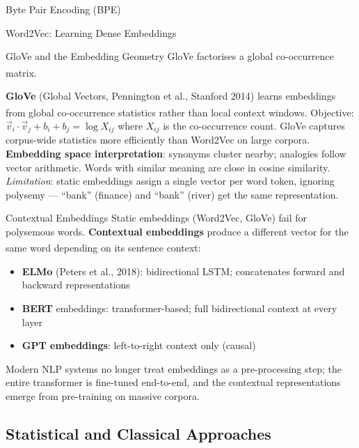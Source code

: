 \begin{v3topic}{Byte Pair Encoding (BPE)}
\begin{v3topic}{Word2Vec: Learning Dense Embeddings}
\end{v3topic}
\begin{v3topic}{GloVe and the Embedding Geometry}
    GloVe factorises a global co-occurrence
    matrix\textsuperscript{\cite{penningtonGloVeGlobalVectors2014}}.

    \textbf{GloVe} (Global Vectors, Pennington et al., Stanford 2014) learns embeddings from global co-occurrence statistics rather than local context windows\textsuperscript{\cite[][p.~35]{farrisHowLargeLanguage2025}}.
    Objective: $\vec{v}_i \cdot \vec{v}_j + b_i + b_j = \log X_{ij}$ where $X_{ij}$ is the co-occurrence count.
    GloVe captures corpus-wide statistics more efficiently than Word2Vec on large corpora.
\visualseparator
    \textbf{Embedding space interpretation}: synonyms cluster nearby; analogies follow vector arithmetic.
    Words with similar meaning are close in cosine similarity.
    \emph{Limitation}: static embeddings assign a single vector per word token, ignoring polysemy --- ``bank'' (finance) and ``bank'' (river) get the same representation.

\end{v3topic}
\begin{v3topic}{Contextual Embeddings}
    Static embeddings (Word2Vec, GloVe) fail for polysemous words.
    \textbf{Contextual embeddings} produce a different vector for the same word depending on its sentence context\textsuperscript{\cite[][p.~35]{farrisHowLargeLanguage2025}}:
    \begin{itemize}
        \item \textbf{ELMo} (Peters et al., 2018): bidirectional LSTM; concatenates forward and backward representations
        \item \textbf{BERT} embeddings: transformer-based; full bidirectional context at every layer
        \item \textbf{GPT embeddings}: left-to-right context only (causal)
    \end{itemize}
    Modern NLP systems no longer treat embeddings as a pre-processing step; the entire transformer is fine-tuned end-to-end, and the contextual representations emerge from pre-training on massive corpora.
\end{v3topic}

\subsection{Statistical and Classical Approaches}


\end{v3topic}
